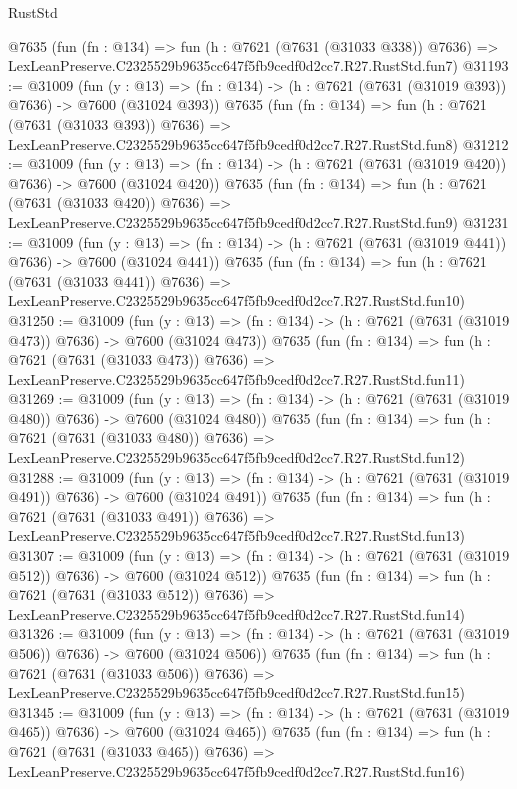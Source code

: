 \begin{lexlean}{RustStd}
\begin{coremodule}
    @7635
    (fun (fn : @134) =>
    fun (h : @7621 (@7631 (@31033 @338)) @7636) =>
    LexLeanPreserve.C2325529b9635cc647f5fb9cedf0d2cc7.R27.RustStd.fun7)
@31193 := @31009
    (fun (y : @13) => (fn : @134) -> (h : @7621 (@7631 (@31019 @393)) @7636) -> @7600 (@31024 @393))
    @7635
    (fun (fn : @134) =>
    fun (h : @7621 (@7631 (@31033 @393)) @7636) =>
    LexLeanPreserve.C2325529b9635cc647f5fb9cedf0d2cc7.R27.RustStd.fun8)
@31212 := @31009
    (fun (y : @13) => (fn : @134) -> (h : @7621 (@7631 (@31019 @420)) @7636) -> @7600 (@31024 @420))
    @7635
    (fun (fn : @134) =>
    fun (h : @7621 (@7631 (@31033 @420)) @7636) =>
    LexLeanPreserve.C2325529b9635cc647f5fb9cedf0d2cc7.R27.RustStd.fun9)
@31231 := @31009
    (fun (y : @13) => (fn : @134) -> (h : @7621 (@7631 (@31019 @441)) @7636) -> @7600 (@31024 @441))
    @7635
    (fun (fn : @134) =>
    fun (h : @7621 (@7631 (@31033 @441)) @7636) =>
    LexLeanPreserve.C2325529b9635cc647f5fb9cedf0d2cc7.R27.RustStd.fun10)
@31250 := @31009
    (fun (y : @13) => (fn : @134) -> (h : @7621 (@7631 (@31019 @473)) @7636) -> @7600 (@31024 @473))
    @7635
    (fun (fn : @134) =>
    fun (h : @7621 (@7631 (@31033 @473)) @7636) =>
    LexLeanPreserve.C2325529b9635cc647f5fb9cedf0d2cc7.R27.RustStd.fun11)
@31269 := @31009
    (fun (y : @13) => (fn : @134) -> (h : @7621 (@7631 (@31019 @480)) @7636) -> @7600 (@31024 @480))
    @7635
    (fun (fn : @134) =>
    fun (h : @7621 (@7631 (@31033 @480)) @7636) =>
    LexLeanPreserve.C2325529b9635cc647f5fb9cedf0d2cc7.R27.RustStd.fun12)
@31288 := @31009
    (fun (y : @13) => (fn : @134) -> (h : @7621 (@7631 (@31019 @491)) @7636) -> @7600 (@31024 @491))
    @7635
    (fun (fn : @134) =>
    fun (h : @7621 (@7631 (@31033 @491)) @7636) =>
    LexLeanPreserve.C2325529b9635cc647f5fb9cedf0d2cc7.R27.RustStd.fun13)
@31307 := @31009
    (fun (y : @13) => (fn : @134) -> (h : @7621 (@7631 (@31019 @512)) @7636) -> @7600 (@31024 @512))
    @7635
    (fun (fn : @134) =>
    fun (h : @7621 (@7631 (@31033 @512)) @7636) =>
    LexLeanPreserve.C2325529b9635cc647f5fb9cedf0d2cc7.R27.RustStd.fun14)
@31326 := @31009
    (fun (y : @13) => (fn : @134) -> (h : @7621 (@7631 (@31019 @506)) @7636) -> @7600 (@31024 @506))
    @7635
    (fun (fn : @134) =>
    fun (h : @7621 (@7631 (@31033 @506)) @7636) =>
    LexLeanPreserve.C2325529b9635cc647f5fb9cedf0d2cc7.R27.RustStd.fun15)
@31345 := @31009
    (fun (y : @13) => (fn : @134) -> (h : @7621 (@7631 (@31019 @465)) @7636) -> @7600 (@31024 @465))
    @7635
    (fun (fn : @134) =>
    fun (h : @7621 (@7631 (@31033 @465)) @7636) =>
    LexLeanPreserve.C2325529b9635cc647f5fb9cedf0d2cc7.R27.RustStd.fun16)

\end{coremodule}
\end{lexlean}
